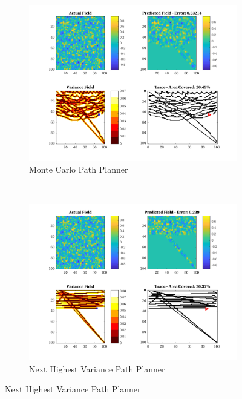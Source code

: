 \begin{figure}[htb!]
    \centering
    \begin{subfigure}[t]{0.5\textwidth}
        \centering
        \includegraphics[width=\linewidth]{figures/hbresults/mc_20p_100x100_sf_1_seed_2.png}
        \captionsetup{skip=0.10\baselineskip,size=footnotesize}
        \caption{Monte Carlo Path Planner}
    \end{subfigure}%
    ~ 
    \begin{subfigure}[t]{0.5\textwidth}
        \centering
        \includegraphics[width=\linewidth]{figures/hbresults/nhv_20p_100x100_sf_1_seed_2.png}
        \captionsetup{skip=0.10\baselineskip,size=footnotesize}
        \caption{Next Highest Variance Path Planner}

\end{subfigure}
\end{figure}
